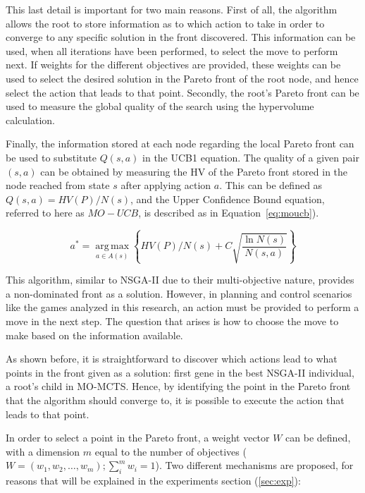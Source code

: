 \documentclass[journal]{IEEEtran}
\newcommand{\argmax}{\operatorname*{arg\,max}}
\providecommand{\DIFaddtex}[1]{{\protect\color{blue}\uwave{#1}}} %
\providecommand{\DIFaddbegin}{} %
\providecommand{\DIFaddend}{} %
\providecommand{\DIFadd}[1]{\texorpdfstring{\DIFaddtex{#1}}{#1}} %
\begin{document}
This last detail is important for two main reasons. First of all, the algorithm allows the root to store information as to which action to take in order to converge to any specific solution in the front discovered. This information can be used, when all iterations have been performed, to select the move to perform next. If weights for the different objectives are provided, these weights can be used to select the desired solution in the Pareto front of the root node, and hence select the action that leads to that point. Secondly, the root's Pareto front can be used to measure the global quality of the search using the hypervolume calculation.

Finally, the information stored at each node regarding the local Pareto front can be used to substitute $Q(s,a)$ in the UCB1 equation. The quality of a given pair $(s,a)$ can be obtained by measuring the HV of the Pareto front stored in the node reached from state $s$ after applying action $a$. This can be defined as  $Q(s,a) = HV(P)/N(s)$, and the Upper Confidence Bound equation, referred to here as $MO-UCB$, is described as in Equation~\ref{eq:moucb}). 

\begin{equation}	\label{eq:moucb}
a^* = \argmax_{a \in A(s)} \left\{HV(P)/N(s) + C \sqrt{\frac{ \ln N(s) }{ N(s,a) }}\right\}
\end{equation}

This algorithm, similar to NSGA-II due to their multi-objective nature, provides a non-dominated front as a solution. However, in planning and control scenarios like the games analyzed in this research, an action must be provided to perform a move in the next step. The question that arises is how to choose the move to make based on the information available.

As shown before, it is straightforward to discover which actions lead to what points in the front given as a solution: \DIFaddbegin \DIFadd{the }\DIFaddend first gene in the best NSGA-II individual, a root's child in MO-MCTS. Hence, by identifying the point in the Pareto front that the algorithm should converge to, it is possible to execute the action that leads to that point.

In order to select a point in the Pareto front, a weight vector $W$ can be defined, with a dimension $m$ equal to the number of objectives ($W = (w_1, w_2, \dots, w_m); \sum_{i}^{m} w_i = 1$). Two different mechanisms are proposed, for reasons that will be explained in the experiments section (\ref{sec:exp}):
\end{document}
